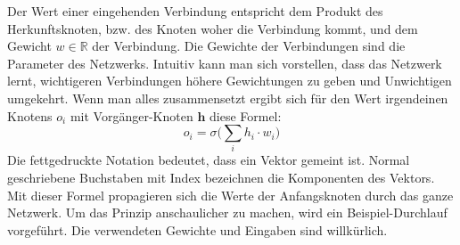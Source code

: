 Der Wert einer eingehenden Verbindung entspricht dem Produkt des Herkunftsknoten, bzw. des Knoten woher die Verbindung kommt, und dem Gewicht $w \in \mathbb{R}$ der Verbindung. Die Gewichte der Verbindungen sind die Parameter des Netzwerks. Intuitiv kann man sich vorstellen, dass das Netzwerk lernt, wichtigeren Verbindungen höhere Gewichtungen zu geben und Unwichtigen umgekehrt. Wenn man alles zusammensetzt ergibt sich für den Wert irgendeinen Knotens $o_i$ mit Vorgänger-Knoten $\boldsymbol{h}$ diese Formel:
$$ o_i = \sigma\Big(\sum_i h_i \cdot w_{i}\Big)$$
Die fettgedruckte Notation bedeutet, dass ein Vektor gemeint ist. Normal geschriebene Buchstaben mit Index bezeichnen die Komponenten des Vektors. Mit dieser Formel propagieren sich die Werte der Anfangsknoten durch das ganze Netzwerk. Um das Prinzip anschaulicher zu machen, wird ein Beispiel-Durchlauf vorgeführt. Die verwendeten Gewichte und Eingaben sind willkürlich.

